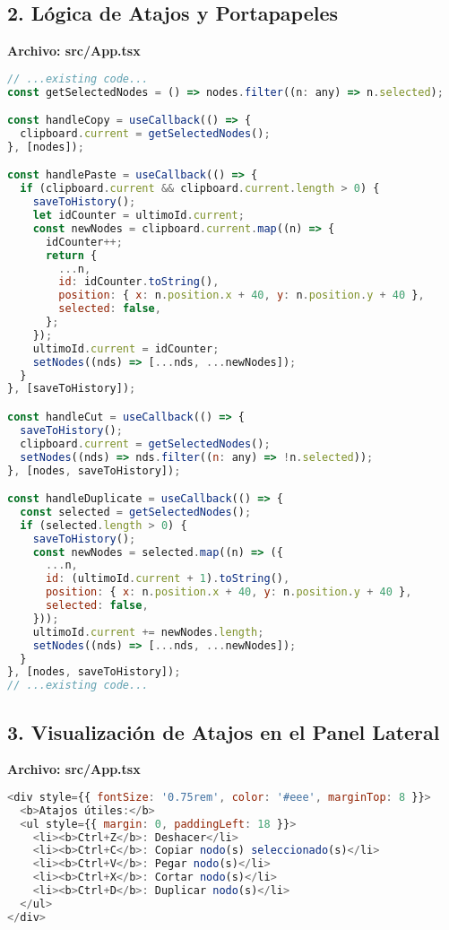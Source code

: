 \documentclass{article}
\begin{document}
\subsection*{2. Lógica de Atajos y Portapapeles}
\textbf{Archivo: src/App.tsx}
\begin{lstlisting}[language=JavaScript, caption=Fragmento de integración de atajos en App.tsx]
// ...existing code...
const getSelectedNodes = () => nodes.filter((n: any) => n.selected);

const handleCopy = useCallback(() => {
  clipboard.current = getSelectedNodes();
}, [nodes]);

const handlePaste = useCallback(() => {
  if (clipboard.current && clipboard.current.length > 0) {
    saveToHistory();
    let idCounter = ultimoId.current;
    const newNodes = clipboard.current.map((n) => {
      idCounter++;
      return {
        ...n,
        id: idCounter.toString(),
        position: { x: n.position.x + 40, y: n.position.y + 40 },
        selected: false,
      };
    });
    ultimoId.current = idCounter;
    setNodes((nds) => [...nds, ...newNodes]);
  }
}, [saveToHistory]);

const handleCut = useCallback(() => {
  saveToHistory();
  clipboard.current = getSelectedNodes();
  setNodes((nds) => nds.filter((n: any) => !n.selected));
}, [nodes, saveToHistory]);

const handleDuplicate = useCallback(() => {
  const selected = getSelectedNodes();
  if (selected.length > 0) {
    saveToHistory();
    const newNodes = selected.map((n) => ({
      ...n,
      id: (ultimoId.current + 1).toString(),
      position: { x: n.position.x + 40, y: n.position.y + 40 },
      selected: false,
    }));
    ultimoId.current += newNodes.length;
    setNodes((nds) => [...nds, ...newNodes]);
  }
}, [nodes, saveToHistory]);
// ...existing code...
\end{lstlisting}

\subsection*{3. Visualización de Atajos en el Panel Lateral}
\textbf{Archivo: src/App.tsx}
\begin{lstlisting}[language=JavaScript, caption=Panel lateral con atajos]
<div style={{ fontSize: '0.75rem', color: '#eee', marginTop: 8 }}>
  <b>Atajos útiles:</b>
  <ul style={{ margin: 0, paddingLeft: 18 }}>
    <li><b>Ctrl+Z</b>: Deshacer</li>
    <li><b>Ctrl+C</b>: Copiar nodo(s) seleccionado(s)</li>
    <li><b>Ctrl+V</b>: Pegar nodo(s)</li>
    <li><b>Ctrl+X</b>: Cortar nodo(s)</li>
    <li><b>Ctrl+D</b>: Duplicar nodo(s)</li>
  </ul>
</div>
\end{lstlisting}
\end{document}
